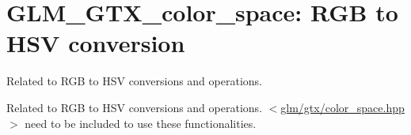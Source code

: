 \hypertarget{group__gtx__color__space}{\section{\-G\-L\-M\-\_\-\-G\-T\-X\-\_\-color\-\_\-space\-: \-R\-G\-B to \-H\-S\-V conversion}
\label{group__gtx__color__space}
}


\-Related to \-R\-G\-B to \-H\-S\-V conversions and operations.  


\-Related to \-R\-G\-B to \-H\-S\-V conversions and operations. $<$\hyperlink{color__space_8hpp}{glm/gtx/color\-\_\-space.\-hpp}$>$ need to be included to use these functionalities. 